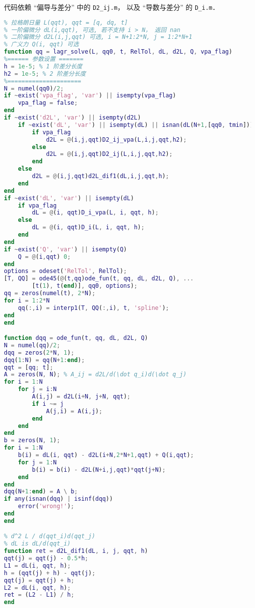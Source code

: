 代码依赖 “偏导与差分” 中的 \verb|D2_ij.m|， 以及 “导数与差分” 的 \verb|D_i.m|．
\begin{lstlisting}[language=matlab, caption=lagr\_solve.m]
% 数值解拉格朗日方程
% 拉格朗日量 L(qqt), qqt = [q, dq, t]
% 一阶偏微分 dL(i,qqt), 可选, 若不支持 i > N， 返回 nan
% 二阶偏微分 d2L(i,j,qqt) 可选, i = N+1:2*N, j = 1:2*N+1
% 广义力 Q(i, qqt) 可选
function qq = lagr_solve(L, qq0, t, RelTol, dL, d2L, Q, vpa_flag)
%====== 参数设置 =======
h = 1e-5; % 1 阶差分长度
h2 = 1e-5; % 2 阶差分长度
%=====================
N = numel(qq0)/2;
if ~exist('vpa_flag', 'var') || isempty(vpa_flag)
    vpa_flag = false;
end
if ~exist('d2L', 'var') || isempty(d2L)
    if ~exist('dL', 'var') || isempty(dL) || isnan(dL(N+1,[qq0, tmin]))
        if vpa_flag
            d2L = @(i,j,qqt)D2_ij_vpa(L,i,j,qqt,h2);
        else
            d2L = @(i,j,qqt)D2_ij(L,i,j,qqt,h2);
        end
    else
        d2L = @(i,j,qqt)d2L_dif1(dL,i,j,qqt,h);
    end
end
if ~exist('dL', 'var') || isempty(dL)
    if vpa_flag
        dL = @(i, qqt)D_i_vpa(L, i, qqt, h);
    else
        dL = @(i, qqt)D_i(L, i, qqt, h);
    end
end
if ~exist('Q', 'var') || isempty(Q)
    Q = @(i,qqt) 0;
end
options = odeset('RelTol', RelTol);
[T, QQ] = ode45(@(t,qq)ode_fun(t, qq, dL, d2L, Q), ...
        [t(1), t(end)], qq0, options);
qq = zeros(numel(t), 2*N);
for i = 1:2*N
    qq(:,i) = interp1(T, QQ(:,i), t, 'spline');
end
end

function dqq = ode_fun(t, qq, dL, d2L, Q)
N = numel(qq)/2;
dqq = zeros(2*N, 1);
dqq(1:N) = qq(N+1:end);
qqt = [qq; t];
A = zeros(N, N); % A_ij = d2L/d(\dot q_i)d(\dot q_j)
for i = 1:N
    for j = i:N
        A(i,j) = d2L(i+N, j+N, qqt);
        if i ~= j
            A(j,i) = A(i,j);
        end
    end
end
b = zeros(N, 1);
for i = 1:N
    b(i) = dL(i, qqt) - d2L(i+N,2*N+1,qqt) + Q(i,qqt);
    for j = 1:N
        b(i) = b(i) - d2L(N+i,j,qqt)*qqt(j+N);
    end
end
dqq(N+1:end) = A \ b;
if any(isnan(dqq) | isinf(dqq))
    error('wrong!');
end
end

% d^2 L / d(qqt_i)d(qqt_j)
% dL is dL/d(qqt_i)
function ret = d2L_dif1(dL, i, j, qqt, h)
qqt(j) = qqt(j) - 0.5*h;
L1 = dL(i, qqt, h);
h = (qqt(j) + h) - qqt(j);
qqt(j) = qqt(j) + h;
L2 = dL(i, qqt, h);
ret = (L2 - L1) / h;
end
\end{lstlisting}

